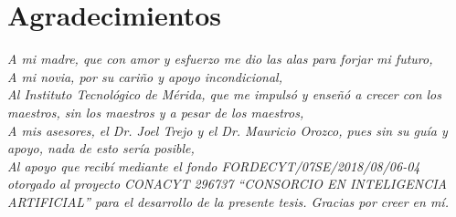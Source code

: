 \chapter*{Agradecimientos} %
\linespread{1.3}
\vspace*{\fill}
  \begin{flushright}
  \bgroup\em
  A mi madre, que con amor y esfuerzo me dio las alas para forjar mi futuro,\\
  A mi novia, por su cariño y apoyo incondicional,\\
  Al Instituto Tecnológico de Mérida, que me impulsó y enseñó a crecer con los
  maestros, sin los maestros y a pesar de los maestros,\\
  A mis asesores, el Dr. Joel Trejo y el Dr. Mauricio Orozco, pues sin su guía y
  apoyo, nada de esto sería posible,\\
  Al apoyo que recibí mediante el fondo FORDECYT/07SE/2018/08/06-04 otorgado al
  proyecto CONACYT 296737 “CONSORCIO EN INTELIGENCIA ARTIFICIAL” para el
  desarrollo de la presente tesis. Gracias por creer en mí.\\
  \egroup{}
  \end{flushright}
\vspace*{\fill}
\clearpage %